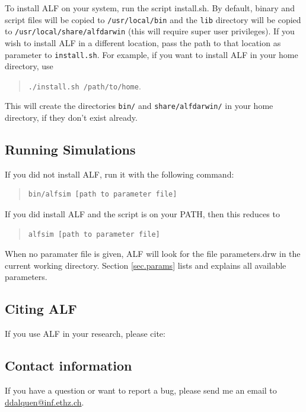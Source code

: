 \documentclass[11pt]{article}
\begin{document}
To install ALF on your system, run the script install.sh. By default, binary and script files will be copied to \texttt{/usr/local/bin} and the \texttt{lib} directory will be copied to \texttt{/usr/local/share/alfdarwin} (this will require super user privileges). If you wish to install ALF in a different location, pass the path to that location as parameter to \texttt{install.sh}. For example, if you want to install ALF in your home directory, use
\begin{quote}
\texttt{./install.sh /path/to/home}.
\end{quote}
This will create the directories \texttt{bin/} and \texttt{share/alfdarwin/} in your home directory, if they don't exist already.

\subsection{Running Simulations}
\label{sec.run}
If you did not install ALF, run it with the following command:
\begin{quote}
\begin{verbatim}
bin/alfsim [path to parameter file]
\end{verbatim}
\end{quote}
If you did install ALF and the script is on your PATH, then this reduces to
\begin{quote}
\begin{verbatim}
alfsim [path to parameter file]
\end{verbatim}
\end{quote}

When no paramater file is given, ALF will look for the file parameters.drw in
the current working directory. Section \ref{sec.params} lists and explains all available parameters.

\subsection{Citing ALF}
If you use ALF in your research, please cite:
\begin{quote}
\end{quote}

\subsection{Contact information}
If you have a question or want to report a bug, please send
me an email to \url{ddalquen@inf.ethz.ch}. 
\end{document}
